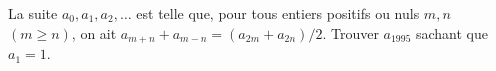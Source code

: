 La suite $a_0, a_1, a_2, \ldots$ est telle que, pour tous entiers positifs ou nuls $m, n$ $(m \geq n)$, on ait $a_{m+n} + a_{m-n} = (a_{2m} + a_{2n})/2$. Trouver $a_{1995}$ sachant que $a_1 = 1$.
